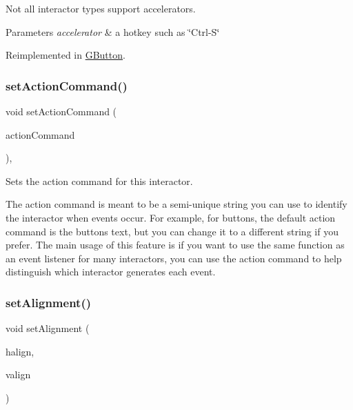 Not all interactor types support accelerators. 
\begin{DoxyParams}{Parameters}
{\em accelerator} & a hotkey such as \char`\"{}\+Ctrl-\/\+S\char`\"{} \\
\hline
\end{DoxyParams}


Reimplemented in \mbox{\hyperlink{classGButton_a5f78fc506a33b57dced42a419be34446}{G\+Button}}.

\mbox{\label{classGInteractor_a4b5843fe3030e038a1ba54cc03389bcf}} 
\subsubsection{\texorpdfstring{set\+Action\+Command()}{setActionCommand()}}
{\footnotesize\ttfamily void set\+Action\+Command (\begin{DoxyParamCaption}\item[{const std\+::string \&}]{action\+Command }\end{DoxyParamCaption})\hspace{0.3cm}{\ttfamily [virtual]}, {\ttfamily [inherited]}}



Sets the action command for this interactor. 

The action command is meant to be a semi-\/unique string you can use to identify the interactor when events occur. For example, for buttons, the default action command is the button\textquotesingle{}s text, but you can change it to a different string if you prefer. The main usage of this feature is if you want to use the same function as an event listener for many interactors, you can use the action command to help distinguish which interactor generates each event. \mbox{\label{classGContainer_a0bcf8805d87afc9bb4c6ca238ca7c0bd}} 
\subsubsection{\texorpdfstring{set\+Alignment()}{setAlignment()}}
{\footnotesize\ttfamily void set\+Alignment (\begin{DoxyParamCaption}\item[{Horizontal\+Alignment}]{halign,  }\item[{Vertical\+Alignment}]{valign }\end{DoxyParamCaption})\hspace{0.3cm}{\ttfamily [virtual]}}



